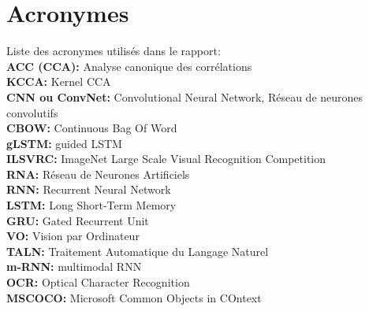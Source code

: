 \pagestyle{fancy}

\renewcommand{\footrulewidth}{1pt}

\fancyhead[L]{\footnotesize \rightmark}
\fancyhead[C]{\thepage}

\fancyfoot[C]{\thepage}

\chapter*{Acronymes}
Liste des acronymes utilisés dans le rapport: \\
\textbf{ACC (CCA):} Analyse canonique des corrélations \\
\textbf{KCCA:} Kernel CCA \\
\textbf{CNN ou ConvNet:} Convolutional Neural Network, Réseau de neurones convolutifs \\
\textbf{CBOW:} Continuous Bag Of Word \\
\textbf{gLSTM:} guided LSTM   \\
\textbf{ILSVRC:} ImageNet Large Scale Visual Recognition Competition \\
\textbf{RNA:} Réseau de Neurones Artificiels \\
\textbf{RNN:} Recurrent Neural Network  \\
\textbf{LSTM:} Long Short-Term Memory \\
\textbf{GRU:} Gated Recurrent Unit\\
\textbf{VO:} Vision par Ordinateur\\
\textbf{TALN:} Traitement Automatique du Langage Naturel\\
\textbf{m-RNN:} multimodal RNN\\
\textbf{OCR:} Optical Character Recognition\\
\textbf{MSCOCO:} Microsoft Common Objects in COntext

